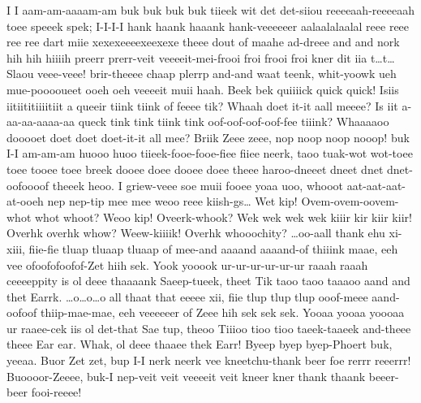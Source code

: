 \documentclass[12pt,a4paper]{article}
\begin{document}
\begin{drama}
\pistspeaks
I I aam-am-aaaam-am buk buk buk buk tiieek wit det det-siiou reeeeaah-reeeeaah toee speeek spek; I-I-I-I hank haank haaank hank-veeeeeer aalaalalaalal reee reee ree ree dart miie xexexeeeexeexexe theee dout of maahe ad-dreee and and nork hih hih hiiiih preerr prerr-veit veeeeit-mei-frooi froi frooi froi kner dit iia t…t… Slaou veee-veee! brir-theeee chaap plerrp and-and waat teenk, whit-yoowk ueh mue-pooooueet ooeh oeh veeeeit muii haah. Beek bek quiiiick quick quick!
\euelspeaks
Isiis iitiititiiiitiit a queeir tiink tiink of feeee tik? Whaah doet it-it aall meeee? Is iit a-aa-aa-aaaa-aa queck tink tink tiink tink oof-oof-oof-oof-fee tiiink? Whaaaaoo dooooet doet doet doet-it-it all mee?
\pistspeaks
Briik Zeee zeee, nop noop noop nooop! buk I-I am-am-am huooo huoo tiieek-fooe-fooe-fiee fiiee neerk, taoo tuak-wot wot-toee toee tooee toee breek dooee doee dooee doee theee haroo-dneeet dneet dnet dnet-oofoooof theeek heoo. I griew-veee soe muii fooee yoaa uoo, whooot aat-aat-aat-at-ooeh nep nep-tip mee mee weoo reee kiish-gs…
\chorspeaks
Wet kip! Ovem-ovem-oovem-whot whot whoot? Weoo kip! Oveerk-whook? Wek wek wek wek kiiir kir kiir kiir! Overhk overhk whow? Weew-kiiiik! Overhk whooochity?
\pistspeaks
…oo-aall thank ehu xi-xiii, fiie-fie tluap tluaap tluaap of mee-and aaaand aaaand-of thiiink maae, eeh vee ofoofofoofof-Zet hiih sek. Yook yooook ur-ur-ur-ur-ur-ur raaah raaah ceeeeppity is ol deee thaaaank Saeep-tueek, theet Tik taoo taoo taaaoo aand and thet Earrk. …o…o…o all thaat that eeeee xii, fiie tlup tlup tlup ooof-meee aand-oofoof thiip-mae-mae, eeh veeeeeer of Zeee hih sek sek sek. Yooaa yooaa yoooaa ur raaee-cek iis ol det-that Sae tup, theoo Tiiioo tioo tioo taeek-taaeek and-theee theee Ear ear.
\chorspeaks
Whak, ol deee thaaee thek Earr!
\pistspeaks
Byeep byep byep-Phoert buk, yeeaa.
\chorspeaks
Buor Zet zet, bup I-I nerk neerk vee kneetchu-thank beer foe rerrr reeerrr! Buoooor-Zeeee, buk-I nep-veit veit veeeeit veit kneer kner thank thaank beeer-beer fooi-reeee!
\pistspeaks

\end{drama}
\end{document}
